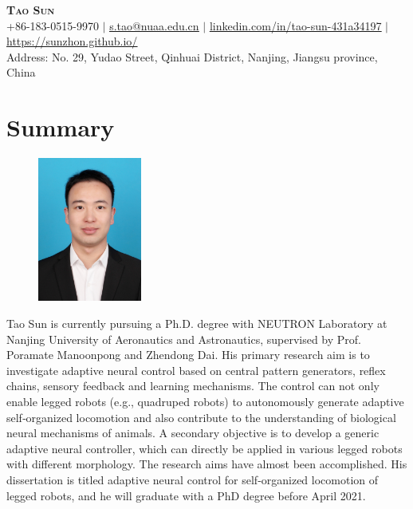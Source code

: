 \documentclass[letterpaper,11pt]{article}
\begin{document}

\begin{center}
    \textbf{\Huge \scshape Tao Sun} \\ \vspace{2pt}
    \small +86-183-0515-9970 $|$ \href{mailto:x@x.com}{\underline{s.tao@nuaa.edu.cn}} $|$ 
    \href{https://linkedin.com/in/tao-sun-431a34197}{\underline{linkedin.com/in/tao-sun-431a34197}} $|$
    \href{https://sunzhon.github.io/}{\underline{https://sunzhon.github.io/}}\\ \vspace{1.5pt}
    Address: No. 29, Yudao Street, Qinhuai District, Nanjing, Jiangsu province, China
\end{center}

\section{Summary}

\begin{figure}%
\includegraphics[width=3.4cm]{suntao.jpg}
\end{figure}Tao Sun is currently pursuing a Ph.D. degree with NEUTRON Laboratory at Nanjing University of Aeronautics and Astronautics, supervised by Prof. Poramate Manoonpong and Zhendong Dai.
His primary research aim is to investigate adaptive neural control based on central pattern generators, reflex chains, sensory feedback and learning mechanisms. The control can not only enable legged robots (e.g., quadruped robots) to autonomously generate adaptive self‐organized locomotion and also contribute to the understanding of biological neural mechanisms of animals. A secondary objective is to develop a generic adaptive neural controller, which can directly be applied in various legged robots with different morphology. The research aims have almost been accomplished. His dissertation is titled adaptive neural control for self‐organized locomotion of legged robots, and he will graduate with a PhD degree before April 2021.
\end{document}
